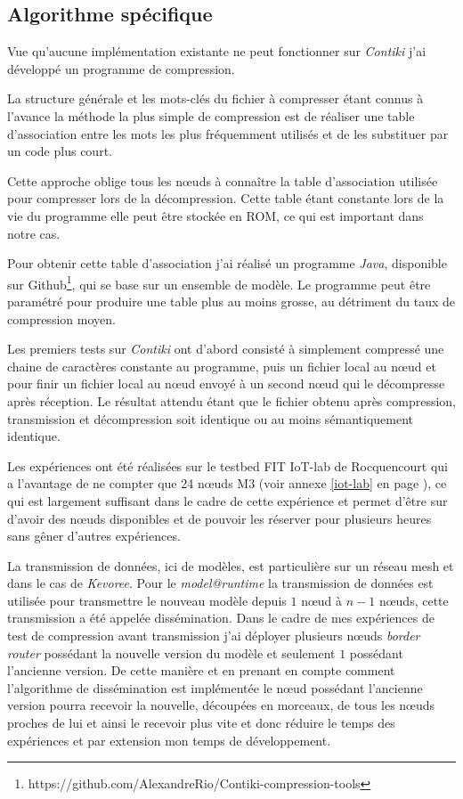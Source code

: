 \subsection{Algorithme spécifique}

Vue qu'aucune implémentation existante ne peut fonctionner sur \emph{Contiki} j'ai développé un programme de compression.

La structure générale et les mots-clés du fichier à compresser étant connus à l'avance la méthode la plus simple de compression est de réaliser une table d'association entre les mots les plus fréquemment utilisés et de les substituer par un code plus court.

Cette approche oblige tous les nœuds à connaître la table d'association utilisée pour compresser lors de la décompression. Cette table étant constante lors de la vie du programme elle peut être stockée en ROM, ce qui est important dans notre cas.

Pour obtenir cette table d'association j'ai réalisé un programme \emph{Java}, disponible sur Github\footnote{https://github.com/AlexandreRio/Contiki-compression-tools}, qui se base sur un ensemble de modèle. Le programme peut être paramétré pour produire une table plus au moins grosse, au détriment du taux de compression moyen.

Les premiers tests sur \emph{Contiki} ont d'abord consisté à simplement compressé une   chaine de caractères constante au programme, puis un fichier local au nœud et pour finir un fichier local au nœud envoyé à un second nœud qui le décompresse après réception. Le résultat attendu étant que le fichier obtenu après compression, transmission et décompression soit identique ou au moins sémantiquement identique.

Les expériences ont été réalisées sur le testbed FIT IoT-lab de Rocquencourt qui a l'avantage de ne compter que 24 nœuds M3 (voir annexe \ref{iot-lab} en page \pageref{iot-lab}), ce qui est largement suffisant dans le cadre de cette expérience et permet d'être sur d'avoir des nœuds disponibles et de pouvoir les réserver pour plusieurs heures sans gêner d'autres expériences.

La transmission de données, ici de modèles, est particulière sur un réseau mesh et dans le cas de \emph{Kevoree}. Pour le \emph{model@runtime} la transmission de données est utilisée pour transmettre le nouveau modèle depuis $1$ nœud à $n-1$ nœuds, cette transmission a été appelée dissémination. Dans le cadre de mes expériences de test de compression avant transmission j'ai déployer plusieurs nœuds \emph{border router} possédant la nouvelle version du modèle et seulement $1$ possédant l'ancienne version. De cette manière et en prenant en compte comment l'algorithme de dissémination est implémentée le nœud possédant l'ancienne version pourra recevoir la nouvelle, découpées en morceaux, de tous les nœuds proches de lui et ainsi le recevoir plus vite et donc réduire le temps des expériences et par extension mon temps de développement.

